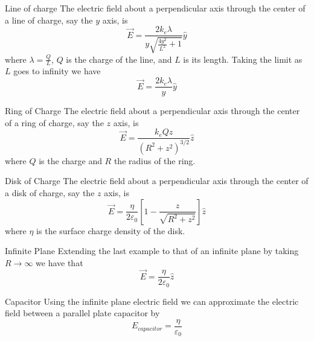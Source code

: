 \documentclass[12pt]{report}
\begin{document}
\begin{prop}{Line of charge}{}
        The electric field about a perpendicular axis through the center of a line of charge, say the $y$ axis, is \begin{equation}
                \vec{E} = \frac{2k_e\lambda}{y\sqrt{\frac{4y^2}{L^2} + 1}}\hat{y}
        \end{equation}
        where $\lambda = \frac{Q}{L}$, $Q$ is the charge of the line, and $L$ is its length. Taking the limit as $L$ goes to infinity we have \begin{equation}
                \vec{E} = \frac{2k_e\lambda}{y}\hat{y}
        \end{equation}
\end{prop}


\begin{prop}{Ring of Charge}{}
        The electric field about a perpendicular axis through the center of a ring of charge, say the $z$ axis, is \begin{equation}
                \vec{E} = \frac{k_eQz}{(R^2+z^2)^{3/2}}\hat{z}
        \end{equation}
        where $Q$ is the charge and $R$ the radius of the ring.
\end{prop}

\begin{prop}{Disk of Charge}{}
        The electric field about a perpendicular axis through the center of a disk of charge, say the $z$ axis, is \begin{equation}
                \vec{E} = \frac{\eta}{2\varepsilon_0}\left[1 - \frac{z}{\sqrt{R^2+z^2}}\right]\hat{z}
        \end{equation}
        where $\eta$ is the surface charge density of the disk. 
\end{prop}

\begin{prop}{Infinite Plane}{}
        Extending the last example to that of an infinite plane by taking $R \rightarrow \infty$ we have that \begin{equation}
                \vec{E} = \frac{\eta}{2\varepsilon_0}\hat{z}
        \end{equation}
\end{prop}

\begin{prop}{Capacitor}{}
        Using the infinite plane electric field we can approximate the electric field between a parallel plate capacitor by \begin{equation}
                E_{capacitor} = \frac{\eta}{\varepsilon_0}
        \end{equation}
\end{prop}
\end{document}
